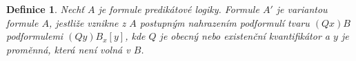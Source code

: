 \documentclass[a4paper, 11pt]{report}
\newtheorem{mydef}{Definice}[chapter]
\newtheorem{veta}{Věta}
\newtheorem{lemma}{Lemma}
\begin{document}
\begin{comment}
\begin{lemma}
Buď $i_1, \dots, i_n$ libovolná permutace čísel $\{1, \dots, n\}$. Nechť $x_1, \dots, x_n$ jsou proměnné a $A$ formule predikátové logiky. Pak platí:
\begin{enumerate}
	\item $\vdash (\forall x_1) \dots (\forall x_n) A \leftrightarrow (\forall x_{i_1}) \dots (\forall x_{i_n}) A $
	\item $\vdash (\exists x_1) \dots (\exists x_n) A \leftrightarrow (\exists x_{i_1}) \dots (\exists x_{i_n}) A $
\end{enumerate}
\end{lemma}

\begin{veta}
Buď $A$ formule taková, že proměnné $x_1, \dots x_n$ jsou jediné proměnné s volným výskytem v $A$. Pak $\vdash A$, právě když $\vdash \forall x_1 \dots \forall x_n A$
\end{veta}

\begin{veta}
(O ekvivalenci) Nechť formule $A'$ vznikne s formule $A$ nahrazením některých výskytů podformulí $B_1 \dots B_n$ pro řadě formulemi $B'_1, \dots, B'_n$. Je-li $\vdash B_i \leftrightarrow B'_i$ pro všechna $i = 1, \dots, n$, pak platí $\vdash A \leftrightarrow A'$.
\end{veta}

\begin{veta}
Buďte $A, B$ formule a $x$ proměnná. Pak

$$ \vdash (\exists x) \lnot A \leftrightarrow \lnot (\forall x) A $$
$$ \vdash (\forall x) \lnot A \leftrightarrow \lnot (\exists x) A $$

Jestliže $x$ není volná ve formuli $A$ a $\circ$ značí některou z výrokových spojek $\land, \lor, \to$, pak platí

$$ \vdash \forall x (A \circ B) \leftrightarrow (A \circ \forall x B) $$
$$ \vdash \exists x (A \circ B) \leftrightarrow (A \circ \exists x B) $$

pro opačnou implikaci $B \to A$ platí:

$$ \vdash \forall x (B \to A) \leftrightarrow (\exists x B \to A)$$
$$ \vdash \exists x (B \to A) \leftrightarrow (\forall x B \to A)$$
\end{veta}
\end{comment}

\begin{mydef}
Nechť $A$ je formule predikátové logiky. Formule $A'$ je \emph{variantou} formule $A$, jestliže vznikne z $A$ postupným nahrazením podformulí tvaru $(Qx) B$ podformulemi $(Q y) B_x[y]$, kde $Q$ je obecný nebo existenční kvantifikátor a $y$ je proměnná, která není volná v $B$.
\end{mydef}
\end{document}
